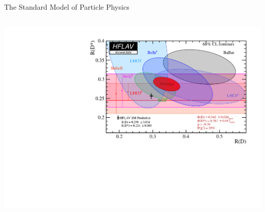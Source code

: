 \documentclass{../bredelebeamer}
\begin{document}
\begin{frame}{The Standard Model of Particle Physics}
\begin{minipage}[t]{0.53\linewidth}
        $$ $$

        \includegraphics[width=1.05\linewidth]{../2023_paper/RDRDst_hflav.pdf}    
    
    \end{minipage}
\end{frame}
\end{document}
